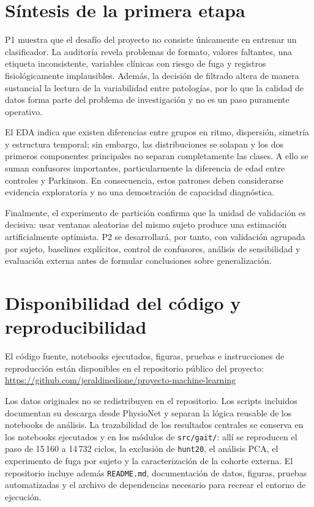 \documentclass[conference]{IEEEtran}
\begin{document}
\section{Síntesis de la primera etapa}

P1 muestra que el desafío del proyecto no consiste únicamente en entrenar un clasificador. La auditoría revela problemas de formato, valores faltantes, una etiqueta inconsistente, variables clínicas con riesgo de fuga y registros fisiológicamente implausibles. Además, la decisión de filtrado altera de manera sustancial la lectura de la variabilidad entre patologías, por lo que la calidad de datos forma parte del problema de investigación y no es un paso puramente operativo.

El EDA indica que existen diferencias entre grupos en ritmo, dispersión, simetría y estructura temporal; sin embargo, las distribuciones se solapan y los dos primeros componentes principales no separan completamente las clases. A ello se suman confusores importantes, particularmente la diferencia de edad entre controles y Parkinson. En consecuencia, estos patrones deben considerarse evidencia exploratoria y no una demostración de capacidad diagnóstica.

Finalmente, el experimento de partición confirma que la unidad de validación es decisiva: usar ventanas aleatorias del mismo sujeto produce una estimación artificialmente optimista. P2 se desarrollará, por tanto, con validación agrupada por sujeto, baselines explícitos, control de confusores, análisis de sensibilidad y evaluación externa antes de formular conclusiones sobre generalización.

\section*{Disponibilidad del código y reproducibilidad}
El código fuente, notebooks ejecutados, figuras, pruebas e instrucciones de reproducción están disponibles en el repositorio público del proyecto:\\
\url{https://github.com/jeraldinedione/proyecto-machine-learning}

Los datos originales no se redistribuyen en el repositorio. Los scripts incluidos documentan su descarga desde PhysioNet y separan la lógica reusable de los notebooks de análisis. La trazabilidad de los resultados centrales se conserva en los notebooks ejecutados y en los módulos de \texttt{src/gait/}: allí se reproducen el paso de 15\,160 a 14\,732 ciclos, la exclusión de \texttt{hunt20}, el análisis PCA, el experimento de fuga por sujeto y la caracterización de la cohorte externa. El repositorio incluye además \texttt{README.md}, documentación de datos, figuras, pruebas automatizadas y el archivo de dependencias necesario para recrear el entorno de ejecución.
\end{document}
